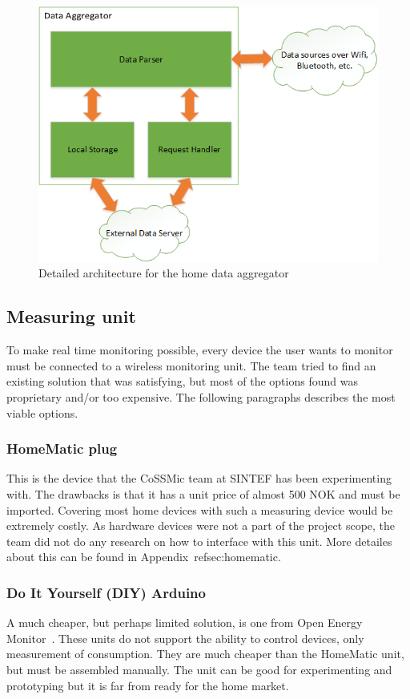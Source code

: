 \begin{figure}[H]
\centering
\includegraphics[height=0.4\textheight]{ch/further/fig/home.png}
\caption{Detailed architecture for the home data aggregator}
\label{fig:aggregator}
\end{figure}

\subsection{Measuring unit}
To make real time monitoring possible, every device the user wants to monitor must be connected to a wireless monitoring unit. The team tried to find an existing solution that was satisfying, but most of the options found was proprietary and/or too expensive. The following paragraphs describes the most viable options.

\subsubsection{HomeMatic plug}
This is the device that the CoSSMic team at SINTEF has been experimenting with. The drawbacks is that it has a unit price of almost 500 NOK and must be imported. Covering most home devices with such a measuring device would be extremely costly. As hardware devices were not a part of the project scope, the team did not do any research on how to interface with this unit. More detailes about this can be found in Appendix~ref{sec:homematic}.

\subsubsection{Do It Yourself (DIY) Arduino}
A much cheaper, but perhaps limited solution, is one from Open Energy Monitor~\cite{oemmodule}. These units do not support the ability to control devices, only measurement of consumption. They are much cheaper than the HomeMatic unit, but must be assembled manually. The unit can be good for experimenting and prototyping but it is far from ready for the home market.


